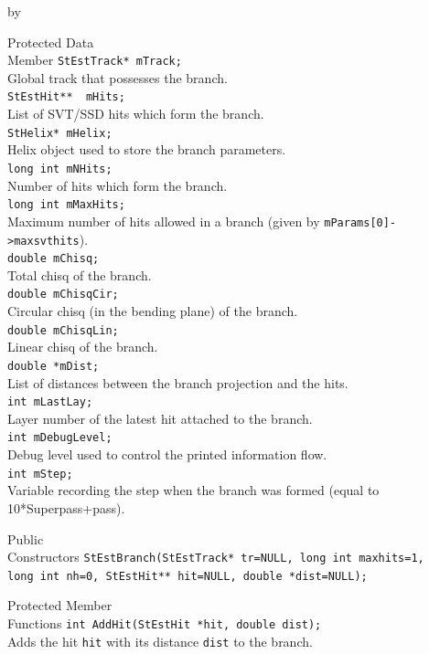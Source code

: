 \documentclass[twoside]{article}
\newcommand{\entrylabel}[1]{\mbox{\textbf{{#1}}}\hfil}%
\newenvironment{entry}
{\begin{list}{}%
    {\renewcommand{\makelabel}{\entrylabel}%
     \setlength{\labelwidth}{90pt}%
     \setlength{\leftmargin}{\labelwidth}
     \advance\leftmargin by \labelsep%
      }%
    }%
  {\end{list}}
\newcommand{\Entrylabel}[1]%
{\raisebox{0pt}[1ex][0pt]{\makebox[\labelwidth][l]%
    {\parbox[t]{\labelwidth}{\hspace{0pt}\textbf{{#1}}}}}}
\newenvironment{Entry}%
{\renewcommand{\entrylabel}{\Entrylabel}\begin{entry}}%
  {\end{entry}}
\begin{document}
\begin{Entry}
\item[Protected Data\\ Member]
	\verb+StEstTrack* mTrack;+\\	 
	Global track that possesses the branch.\\
	\verb+StEstHit**  mHits;+\\
	List of SVT/SSD hits which form the branch.\\
	\verb+StHelix* mHelix;+\\
	Helix object used to store the branch parameters.\\
	\verb+long int mNHits;+\\ 
	Number of hits which form the branch.\\
	\verb+long int mMaxHits;+\\
	Maximum number of hits allowed in a branch (given by \verb+mParams[0]->maxsvthits+).\\
	\verb+double mChisq;+\\
	Total chisq of the branch.\\
	\verb+double mChisqCir;+\\
	Circular chisq (in the bending plane) of the branch.\\
	\verb+double mChisqLin;+\\
	Linear chisq of the branch.\\
	\verb+double *mDist;+\\
	List of distances between the branch projection and the hits.\\
	\verb+int mLastLay;+\\
	Layer number of the latest hit attached to the branch.\\
	\verb+int mDebugLevel;+\\
	Debug level used to control the printed information flow.\\
	\verb+int mStep;+\\
	Variable recording the step when the branch was formed (equal to 10*Superpass+pass).\\
\item[Public\\ Constructors]
	\verb+StEstBranch(StEstTrack* tr=NULL, long int maxhits=1,+\\
	\verb+long int nh=0, StEstHit** hit=NULL, double *dist=NULL);+\\
\item[Protected Member\\ Functions]
	\verb+int AddHit(StEstHit *hit, double dist);+\\
	Adds the hit \verb+hit+ with its distance \verb+dist+ to the branch.\\

\end{Entry}
\end{document}
